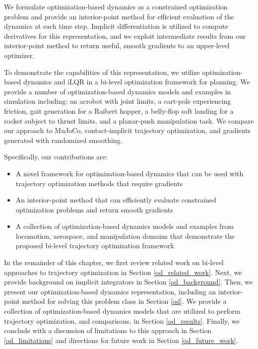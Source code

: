 We formulate optimization-based dynamics as a constrained optimization problem and provide an interior-point method for efficient evaluation of the dynamics at each time step. Implicit differentiation is utilized to compute derivatives for this representation, and we exploit intermediate results from our interior-point method to return useful, smooth gradients to an upper-level optimizer.

To demonstrate the capabilities of this representation, we utilize optimization-based dynamics and iLQR in a bi-level optimization framework for planning. We provide a number of optimization-based dynamics models and examples in simulation including: an acrobot with joint limits, a cart-pole experiencing friction, gait generation for a Raibert hopper, a belly-flop soft landing for a rocket subject to thrust limits, and a planar-push manipulation task. We compare our approach to MuJoCo, contact-implicit trajectory optimization, and gradients generated with randomized smoothing.

Specifically, our contributions are:
\begin{itemize}
	\item A novel framework for optimization-based dynamics that can be used with trajectory optimization methods that require gradients
	\item An interior-point method that can efficiently evaluate constrained optimization problems and return smooth gradients
	\item A collection of optimization-based dynamics models and examples from locomotion, aerospace, and manipulation domains that demonstrate the proposed bi-level trajectory optimization framework
\end{itemize}

In the remainder of this chapter, we first review related work on bi-level approaches to trajectory optimization in Section \ref{od_related_work}. Next, we provide background on implicit integrators in Section \ref{od_background}. Then, we present our optimization-based dynamics representation, including an interior-point method for solving this problem class in Section \ref{od}. We provide a collection of optimization-based dynamics models that are utilized to perform trajectory optimization, and comparisons, in Section \ref{od_results}. Finally, we conclude with a discussion of limitations to this approach in Section \ref{od_limitations} and directions for future work in Section \ref{od_future_work}.

